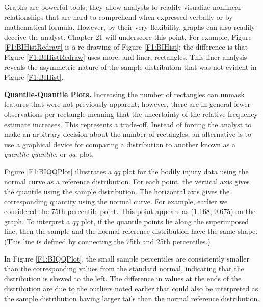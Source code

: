 Graphs are powerful tools; they allow analysts to readily visualize
nonlinear relationships that are hard to comprehend when expressed
verbally or by mathematical formula. However, by their very
flexibility, graphs can also readily deceive the analyst. Chapter 21
will underscore this point. For example, Figure
\ref{F1:BIHistRedraw} is a re-drawing of Figure \ref{F1:BIHist}; the
difference is that Figure \ref{F1:BIHistRedraw} uses more, and
finer, rectangles. This finer analysis reveals the asymmetric nature
of the sample distribution that was not evident in Figure
\ref{F1:BIHist}.


\bigskip

\textbf{Quantile-Quantile Plots.} Increasing the number of
rectangles can unmask features that were not previously apparent;
however, there are in general fewer observations per rectangle
meaning that the uncertainty of the relative frequency estimate
increases. This represents a trade-off. Instead of forcing the
analyst to make an arbitrary decision about the number of
rectangles, an alternative is to use a graphical device for
comparing a distribution to another known as a
\emph{quantile-quantile}, or \emph{qq},
plot.

Figure \ref{F1:BIQQPlot} illustrates a $qq$ plot for the bodily
injury data using the normal curve as a reference distribution. For
each point, the vertical axis gives the quantile using the sample
distribution. The horizontal axis gives the corresponding quantity
using the normal curve. For example, earlier we considered the 75th
percentile point. This point appears as (1.168, 0.675) on the graph.
To interpret a $qq$ plot, if the quantile points lie along the
superimposed line, then the sample and the normal reference
distribution have the same shape. (This line is defined by
connecting the 75th and 25th percentiles.)


In Figure \ref{F1:BIQQPlot}, the small sample percentiles are
consistently smaller than the corresponding values from the standard
normal, indicating that the distribution is skewed to the left. The
difference in values at the ends of the distribution are due to the
outliers noted earlier that could also be interpreted as the sample
distribution having larger tails than the normal reference
distribution.




